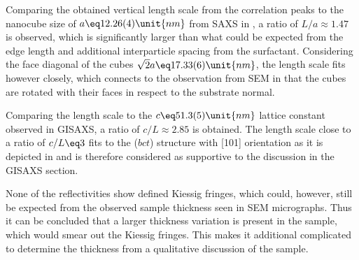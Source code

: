 \documentclass[\main/dresen_thesis.tex]{subfiles}
\begin{document}
  Comparing the obtained vertical length scale from the correlation peaks to the nanocube size of $a \eq 12.26(4) \unit{nm}$ from SAXS in , a ratio of $L/a \approx 1.47$ is observed, which is significantly larger than what could be expected from the edge length and additional interparticle spacing from the surfactant.
  Considering the face diagonal of the cubes $\sqrt{2} a \eq 17.33(6) \unit{nm}$, the length scale fits however closely, which connects to the observation from SEM in  that the cubes are rotated with their faces in respect to the substrate normal.

  Comparing the length scale to the $c\eq 51.3(5) \unit{nm}$ lattice constant observed in GISAXS, a ratio of  $c / L \approx 2.85$ is obtained.
  The length scale close to a ratio of $c/L \eq 3$ fits to the ($bct$) structure with [101] orientation as it is depicted in  and is therefore considered as supportive to the discussion in the GISAXS section.

  None of the reflectivities show defined Kiessig fringes, which could, however, still be expected from the observed sample thickness seen in SEM micrographs.
  Thus it can be concluded that a larger thickness variation is present in the sample, which would smear out the Kiessig fringes.
  This makes it additional complicated to determine the thickness from a qualitative discussion of the sample.
\end{document}
